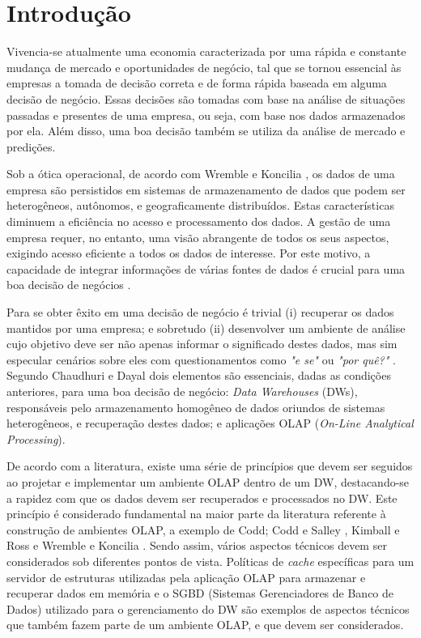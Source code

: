 \chapter{Introdução}
\label{intro}

Vivencia-se atualmente uma economia caracterizada por uma rápida e constante mudança de mercado e oportunidades de negócio, 
tal que se tornou essencial às empresas a tomada de decisão correta e de forma rápida baseada em alguma decisão de negócio. 
Essas decisões são tomadas com base na análise de situações passadas e presentes de uma empresa, ou seja, com base nos dados armazenados por ela. 
Além disso, uma boa decisão também se utiliza da análise de mercado e predições.

Sob a ótica operacional, de acordo com Wremble e Koncilia \cite{wrembel2007data}, os dados de uma empresa são persistidos em sistemas de armazenamento 
de dados que podem ser heterogêneos, autônomos, e geograficamente distribuídos. Estas características diminuem a eficiência no acesso e processamento dos dados. 
A gestão de uma empresa requer, no entanto, uma visão abrangente de todos os seus aspectos, exigindo acesso eficiente a todos os dados de interesse. 
Por este motivo, a capacidade de integrar informações de várias fontes de dados é crucial para uma boa decisão de negócios \cite{wrembel2007data}.

Para se obter êxito em uma decisão de negócio é trivial (i) recuperar os dados mantidos por uma empresa; e sobretudo 
(ii) desenvolver um ambiente de análise cujo objetivo deve ser não apenas informar o significado destes dados, 
mas sim especular cenários sobre eles com questionamentos como \textit{"e se"} ou \textit{"por quê?"} \cite{codd1998providing}. 
Segundo Chaudhuri e Dayal \cite{chaudhuri1997overview} dois elementos são essenciais, dadas as condições anteriores, para uma boa decisão de negócio: 
\textit{Data Warehouses} (DWs), responsáveis pelo armazenamento homogêneo de dados oriundos de sistemas heterogêneos, e recuperação destes dados; 
e aplicações OLAP (\textit{On-Line Analytical Processing}).

De acordo com a literatura, existe uma série de princípios que devem ser seguidos ao projetar e implementar um ambiente OLAP dentro de um DW, destacando-se a rapidez com que os dados devem ser recuperados e processados no DW. Este princípio é considerado fundamental 
na maior parte da literatura referente à construção de ambientes OLAP, a exemplo de Codd; Codd e Salley \cite{codd1998providing}, Kimball e Ross \cite{kimball2002dw} 
e Wremble e Koncilia \cite{wrembel2007data}. Sendo assim, vários aspectos técnicos devem ser considerados sob diferentes pontos de vista. 
Políticas de \textit{cache} específicas para um servidor de estruturas utilizadas pela aplicação OLAP para armazenar e recuperar dados em memória 
e o SGBD (Sistemas Gerenciadores de Banco de Dados) utilizado para o gerenciamento do DW são exemplos de aspectos técnicos que também fazem parte de um ambiente OLAP, 
e que devem ser considerados. 

